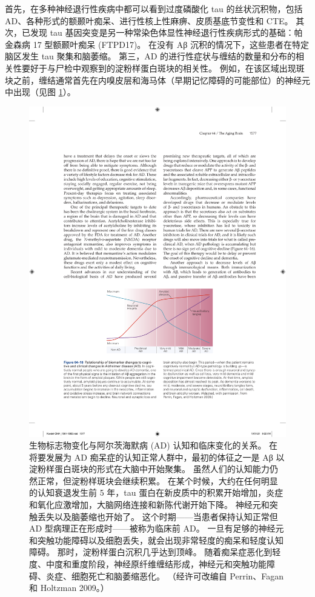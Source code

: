 首先，在多种神经退行性疾病中都可以看到过度磷酸化 tau 的丝状沉积物，包括 AD、各种形式的额颞叶痴呆、进行性核上性麻痹、皮质基底节变性和 CTE。 其次，已发现 tau 基因突变是另一种常染色体显性神经退行性疾病形式的基础：帕金森病 17 型额颞叶痴呆 (FTPD17)。 在没有 Aβ 沉积的情况下，这些患者在特定脑区发生 tau 聚集和脑萎缩。 第三，AD 的进行性症状与缠结的数量和分布的相关性要好于与尸检中观察到的淀粉样蛋白斑块的相关性。 例如，在该区域出现斑块之前，缠结通常首先在内嗅皮层和海马体（早期记忆障碍的可能部位）的神经元中出现（见图 \ref{fig:64_16}）。

\begin{figure}[htbp]
	\centering
	\includegraphics[width=0.7\linewidth]{chap64/fig_64_16}
	\caption{生物标志物变化与阿尔茨海默病 (AD) 认知和临床变化的关系。 在将要发展为 AD 痴呆症的认知正常人群中，最初的体征之一是 Aβ 以淀粉样蛋白斑块的形式在大脑中开始聚集。 虽然人们的认知能力仍然正常，但淀粉样斑块会继续积累。 在某个时候，大约在任何明显的认知衰退发生前 5 年，tau 蛋白在新皮质中的积累开始增加，炎症和氧化应激增加，大脑网络连接和新陈代谢开始下降。 神经元和突触丢失以及脑萎缩也开始了。 这个时期——当患者保持认知正常但 AD 型病理正在形成时——被称为临床前 AD。 一旦有足够的神经元和突触功能障碍以及细胞丢失，就会出现非常轻度的痴呆和轻度认知障碍。 那时，淀粉样蛋白沉积几乎达到顶峰。 随着痴呆症恶化到轻度、中度和重度阶段，神经原纤维缠结形成，神经元和突触功能障碍、炎症、细胞死亡和脑萎缩恶化。 （经许可改编自 Perrin、Fagan 和 Holtzman 2009。）}
	\label{fig:64_16}
\end{figure}

